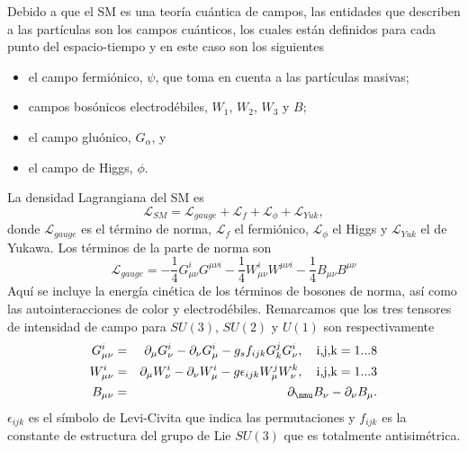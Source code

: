 Debido a que el SM es una teoría cuántica de campos, las entidades que describen a las partículas son los campos cuánticos, los cuales están definidos para cada punto del espacio-tiempo y en este caso son los siguientes

\begin{itemize}
    \item el campo fermiónico, \(\psi\), que toma en cuenta a las partículas masivas;
    \item campos bosónicos electrodébiles, \(W_{1}\), \(W_{2}\), \(W_{3}\) y \(B\);
    \item el campo gluónico, \(G_{\alpha}\), y
    \item el campo de Higgs, \(\phi\).
\end{itemize}

La densidad Lagrangiana del SM es
\begin{equation}
    \mathcal{L}_{SM} = \mathcal{L}_{gauge}+\mathcal{L}_f+\mathcal{L}_\phi+\mathcal{L}_{Yuk},
\end{equation}
donde \(\mathcal{L}_{gauge}\) es el término de norma, \(\mathcal{L}_f\) el fermiónico, \(\mathcal{L}_\phi\) el Higgs y \(\mathcal{L}_{Yuk}\) el de Yukawa. Los términos de la parte de norma son
\begin{equation}
    \mathcal{L}_{gauge}=-\frac{1}{4}G^i_{\mu\nu}G^{\mu\nu i}-\frac{1}{4}W^i_{\mu\nu}W^{\mu\nu i}-\frac{1}{4}B_{\mu\nu}B^{\mu\nu} \label{lgauge}
\end{equation}
Aquí se incluye la energía cinética de los términos de bosones de norma, así como las autointeracciones de color y electrodébiles. Remarcamos que los tres tensores de intensidad de campo para \(SU(3)\), \(SU(2)\) y \(U(1)\) son respectivamente
\begin{eqnarray}
    G^i_{\mu\nu} &=& \partial_{\mu}G^i_{\nu}-\partial_{\nu}G^i_{\mu}-g_{s}f_{ijk}G^j_{k}G^i_{\nu},  \quad \textrm{i,j,k}=1...8 \nonumber \\
    W^i_{\mu\nu}&=&\partial_{\mu}W^i_{\nu}-\partial_{\nu}W^i_{\mu}-g\epsilon_{ijk}W^j_{\mu}W^k_{\nu},\quad \textrm{i,j,k}=1...3 \nonumber \\
    B_{\mu\nu} &=& \partial_{\nmu}B_{\nu}-\partial_{\nu}B_{\mu}.
\end{eqnarray}
\(\epsilon_{ijk}\) es el símbolo de Levi-Civita que indica las permutaciones y \(f_{ijk}\) es la constante de estructura del grupo de Lie \(SU(3)\) que es totalmente antisimétrica.

